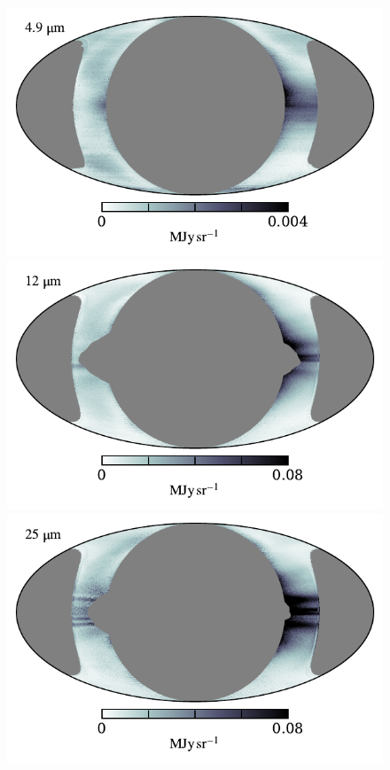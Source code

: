 \documentclass{aa}
\begin{document}
\begin{figure}
  \centering
  \includegraphics[width=0.83\linewidth]{figs/rms_solar_04.pdf}\\\vspace*{-2mm}
  \includegraphics[width=0.83\linewidth]{figs/rms_solar_05.pdf}\\\vspace*{-2mm}
  \includegraphics[width=0.83\linewidth]{figs/rms_solar_06.pdf}\\\vspace*{-2mm}

\end{figure}
\end{document}
